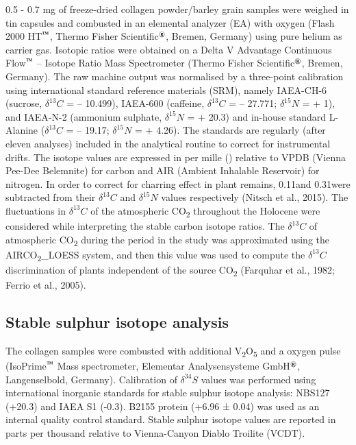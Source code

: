 \documentclass[5p]{elsarticle} %
\begin{document}
0.5 - 0.7 mg of freeze-dried collagen powder/barley grain samples were weighed in tin capsules and combusted in an elemental analyzer (EA) with oxygen (Flash 2000 HT\(^\text{\texttrademark}\), Thermo Fisher Scientific\(^\text{\textregistered}\), Bremen, Germany) using pure helium as carrier gas. Isotopic ratios were obtained on a Delta V Advantage Continuous Flow\(^\text{\texttrademark}\) -- Isotope Ratio Mass Spectrometer (Thermo Fisher Scientific\(^\text{\textregistered}\), Bremen, Germany). The raw machine output was normalised by a three-point calibration using international standard reference materials (SRM), namely IAEA-CH-6 (sucrose, \(\delta ^{13}C\) = -- 10.499\permil), IAEA-600 (caffeine, \(\delta ^{13}C\) = -- 27.771\permil; \(\delta ^{15}N\) = + 1\permil), and IAEA-N-2 (ammonium sulphate, \(\delta ^{15}N\) = + 20.3\permil) and in-house standard L-Alanine (\(\delta ^{13}C\) = -- 19.17\permil; \(\delta ^{15}N\) = + 4.26\permil). The standards are regularly (after eleven analyses) included in the analytical routine to correct for instrumental drifts. The isotope values are expressed in per mille (\permil) relative to VPDB (Vienna Pee-Dee Belemnite) for carbon and AIR (Ambient Inhalable Reservoir) for nitrogen. In order to correct for charring effect in plant remains, 0.11\permil and 0.31\permil were subtracted from their \(\delta ^{13}C\) and \(\delta ^{15}N\) values respectively (Nitsch et al., 2015). The fluctuations in \(\delta ^{13}C\) of the atmospheric CO\textsubscript{2} throughout the Holocene were considered while interpreting the stable carbon isotope ratios. The \(\delta ^{13}C\) of atmospheric CO\textsubscript{2} during the period in the study was approximated using the AIRCO\textsubscript{2}\_LOESS system, and then this value was used to compute the \(\delta ^{13}C\) discrimination of plants independent of the source CO\textsubscript{2} (Farquhar et al., 1982; Ferrio et al., 2005).

\hypertarget{stable-sulphur-isotope-analysis}{%
\subsection{Stable sulphur isotope analysis}\label{stable-sulphur-isotope-analysis}}

The collagen samples were combusted with additional V\textsubscript{2}O\textsubscript{5} and a oxygen pulse (IsoPrime\(^\text{\texttrademark}\) Mass spectrometer, Elementar Analysensysteme GmbH\(^\text{\textregistered}\), Langenselbold, Germany). Calibration of \(\delta ^{34}S\) values was performed using international inorganic standards for stable sulphur isotope analysis: NBS127 (+20.3\permil) and IAEA S1 (-0.3\permil). B2155 protein (+6.96 ± 0.04\permil) was used as an internal quality control standard. Stable sulphur isotope values are reported in parts per thousand relative to Vienna-Canyon Diablo Troilite (VCDT).
\end{document}
